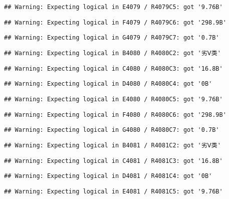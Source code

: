 \documentclass[
]{article}
\begin{document}
\begin{verbatim}
## Warning: Expecting logical in E4079 / R4079C5: got '9.76B'
\end{verbatim}

\begin{verbatim}
## Warning: Expecting logical in F4079 / R4079C6: got '298.9B'
\end{verbatim}

\begin{verbatim}
## Warning: Expecting logical in G4079 / R4079C7: got '0.7B'
\end{verbatim}

\begin{verbatim}
## Warning: Expecting logical in B4080 / R4080C2: got '劣Ⅴ类'
\end{verbatim}

\begin{verbatim}
## Warning: Expecting logical in C4080 / R4080C3: got '16.8B'
\end{verbatim}

\begin{verbatim}
## Warning: Expecting logical in D4080 / R4080C4: got '0B'
\end{verbatim}

\begin{verbatim}
## Warning: Expecting logical in E4080 / R4080C5: got '9.76B'
\end{verbatim}

\begin{verbatim}
## Warning: Expecting logical in F4080 / R4080C6: got '298.9B'
\end{verbatim}

\begin{verbatim}
## Warning: Expecting logical in G4080 / R4080C7: got '0.7B'
\end{verbatim}

\begin{verbatim}
## Warning: Expecting logical in B4081 / R4081C2: got '劣Ⅴ类'
\end{verbatim}

\begin{verbatim}
## Warning: Expecting logical in C4081 / R4081C3: got '16.8B'
\end{verbatim}

\begin{verbatim}
## Warning: Expecting logical in D4081 / R4081C4: got '0B'
\end{verbatim}

\begin{verbatim}
## Warning: Expecting logical in E4081 / R4081C5: got '9.76B'
\end{verbatim}
\end{document}
